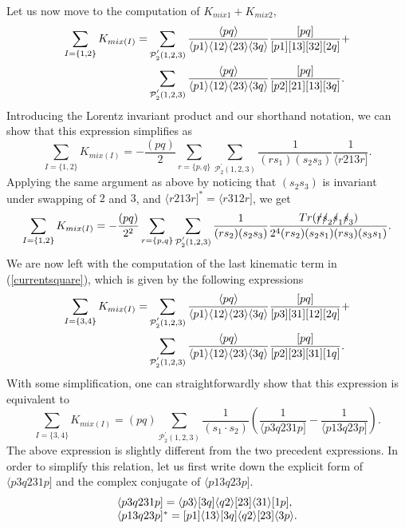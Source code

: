 Let us now move to the computation of $K_{mix1}+K_{mix2}$, 
\begin{align}
\sum_{I=\{1,2\}} K_{mix(I)}= &\sum_{\mathcal{P}^{'}_2(1,2,3)} \frac{\langle pq\rangle}{\langle p1\rangle \langle12\rangle \langle23\rangle \langle3q\rangle} \frac{[pq]}{[p1] [13] [32] [2q]}+ \\
& \sum_{\mathcal{P}^{'}_2(1,2,3)} \frac{\langle pq\rangle}{\langle p1\rangle \langle12\rangle \langle23\rangle \langle3q\rangle} \frac{[pq]}{[p2] [21] [13] [3q]}.
\end{align}
Introducing the Lorentz invariant product and our shorthand notation, we can show that this expression simplifies as 
\begin{equation}
\sum_{I=\{1,2\}} K_{mix(I)}= -\frac{(p  q)}{2} \sum_{r=\{p,q\}} \sum_{\mathcal{P}^{'}_2(1,2,3)} \frac{1}{(r s_1) (s_2 s_3)} \frac{1}{\langle r213r]}.
\end{equation}
Applying the same argument as above by noticing that $(s_2s_3)$ is invariant under swapping of $2$ and $3$, and $\langle r213r]^*=\langle r312r]$, we get 
\begin{equation}
\sum_{I=\{1,2\}} K_{mix(I)}= -\frac{(p q)}{2^2} \sum_{r=\{p,q\}} \sum_{\mathcal{P}^{'}_2(1,2,3)} \frac{1}{(r s_2) (s_2 s_3)} \frac{Tr(\slashed{r} \slashed{s}_2 \slashed{s}_1 \slashed{s}_3)}{2^4(r s_2) (s_2 s_1) (r  s_3) (s_3 s_1)}.
\end{equation}
We are now left with the computation of the last kinematic term in (\ref{currentsquare}), which is given by the following expressions
\begin{align}
\sum_{I=\{3,4\}} K_{mix(I)}= &\sum_{\mathcal{P}^{'}_2(1,2,3)} \frac{\langle pq\rangle}{\langle p1\rangle \langle12\rangle \langle23\rangle \langle3q\rangle} \frac{[pq]}{[p3] [31] [12] [2q]}+ \\
& \sum_{\mathcal{P}^{'}_2(1,2,3)} \frac{\langle pq\rangle}{\langle p1\rangle \langle12\rangle \langle23\rangle \langle3q\rangle} \frac{[pq]}{[p2] [23] [31] [1q]}.
\end{align}
With some simplification, one can straightforwardly show that this expression is equivalent to
\begin{equation}
\sum_{I=\{3,4\}} K_{mix(I)}= (p q) \sum_{\mathcal{P}^{'}_2(1,2,3)} \frac{1}{(s_1 \cdot s_2)} \left( \frac{1}{\langle p3q231p]}-\frac{1}{\langle p13q23p]} \right).
\end{equation}
The above expression is slightly different from the two precedent expressions. In order to simplify this relation, let us first write down the explicit form of $\langle p3q231p]$ and the complex conjugate of $\langle p13q23p]$. 
\begin{align}
\begin{array}{l}
\langle p3q231p] =\langle p3\rangle [3q] \langle q2\rangle [23] \langle31\rangle [1p], \\
\langle p13q23p]^* = [p1] \langle13\rangle [3q] \langle q2\rangle [23] \langle3p\rangle.
\end{array}
\end{align}

